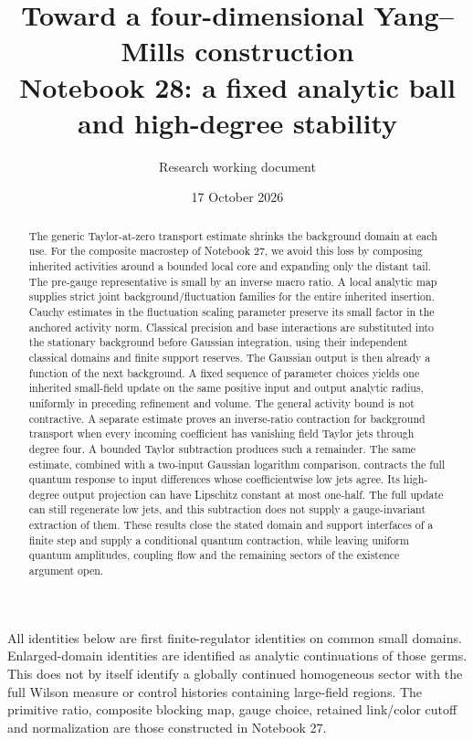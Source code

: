\documentclass[11pt]{article}
\title{Toward a four-dimensional Yang--Mills construction\\
\large Notebook 28: a fixed analytic ball and high-degree stability}
\author{Research working document}
\date{17 October 2026}
\theoremstyle{remark}
\begin{document}
\maketitle
\begin{abstract}
The generic Taylor-at-zero transport estimate shrinks the background
domain at each use. For the composite macrostep of Notebook 27,
we avoid this loss by composing inherited activities around a
bounded local core and expanding only the distant tail. The
pre-gauge representative is small by an inverse macro ratio.
A local analytic map supplies strict joint background/fluctuation
families for the entire inherited insertion. Cauchy estimates in
the fluctuation scaling parameter preserve its small factor in
the anchored activity norm. Classical precision and base
interactions are substituted into the stationary background
before Gaussian integration, using their independent classical
domains and finite support reserves. The Gaussian output is then
already a function of the next background.
A fixed sequence of parameter choices yields one inherited
small-field update on the same positive input and output
analytic radius, uniformly in preceding refinement and volume.
The general activity bound is not contractive. A separate
estimate proves an inverse-ratio contraction for background
transport when every incoming coefficient has vanishing
field Taylor jets through degree four. A bounded Taylor
subtraction produces such a remainder. The same estimate,
combined with a two-input Gaussian logarithm comparison,
contracts the full quantum response to input differences
whose coefficientwise low jets agree. Its high-degree
output projection can have Lipschitz constant at most
one-half. The full update can still regenerate low jets,
and this subtraction does not supply a gauge-invariant
extraction of them. These results close the stated domain
and support interfaces of a finite step and supply a
conditional quantum contraction, while leaving uniform
quantum amplitudes, coupling flow and the remaining
sectors of the existence argument open.
\end{abstract}

All identities below are first finite-regulator identities on
common small domains. Enlarged-domain identities are identified
as analytic continuations of those germs. This does not by itself
identify a globally continued homogeneous sector with the full
Wilson measure or control histories containing large-field
regions. The primitive ratio, composite blocking map, gauge
choice, retained link/color cutoff and normalization are those
constructed in Notebook 27.
\end{document}
